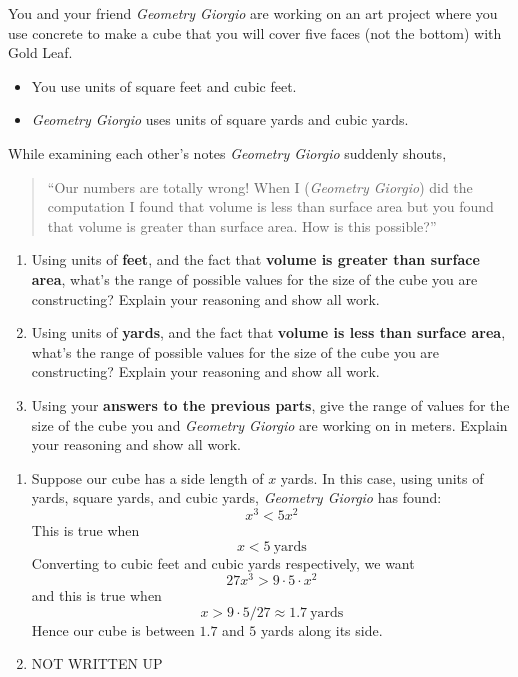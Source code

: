 \documentclass[handout,nooutcomes,noauthor,12pt]{ximera}
\begin{document}
\begin{question}
  You and your friend \textit{Geometry Giorgio} are working on an art
  project where you use concrete to make a cube that you will cover
  five faces (not the bottom) with Gold Leaf.
  \begin{itemize}
  \item You use units of square feet and cubic feet.
  \item \textit{Geometry Giorgio} uses units of square yards and cubic
    yards.
  \end{itemize}
  While examining each other's notes \textit{Geometry Giorgio}
  suddenly shouts,
  \begin{quote}
    ``Our numbers are totally wrong! When I (\textit{Geometry Giorgio})
    did the computation I found that volume is less than surface area
    but you found that volume is greater than surface area.  How is
    this possible?''
  \end{quote}
  \begin{enumerate}
  \item Using units of \textbf{feet}, and the fact that \textbf{volume
    is greater than surface area}, what's the range of possible values
    for the size of the cube you are constructing? Explain your
    reasoning and show all work.
  \item Using units of \textbf{yards}, and the fact that \textbf{volume is
    less than surface area}, what's the range of possible values for the
    size of the cube you are constructing? Explain your reasoning and
    show all work.
  \item Using your \textbf{answers to the previous parts}, give the range of
    values for the size of the cube you and \textit{Geometry Giorgio}
    are working on in meters.  Explain your reasoning and
    show all work.
  \end{enumerate}
  \begin{freeResponse}
    \begin{enumerate}
    \item Suppose our cube has a side length of $x$ yards. In this
      case, using units of yards, square yards, and cubic yards,
      \textit{Geometry Giorgio} has found:
      \[
      x^3 < 5x^2
      \]
      This is true when
      \[
      x<5~\text{yards}
      \]
      Converting to cubic feet and cubic yards respectively, we want
      \[
      27x^3 > 9\cdot 5\cdot x^2
      \]
      and this is true when
      \[
      x > 9\cdot 5/27 \approx 1.7~\text{yards}
      \]
      Hence our cube is between $1.7$ and $5$ yards along its side.
    \item NOT WRITTEN UP
    \end{enumerate}
  \end{freeResponse}
\end{question}
\end{document}
